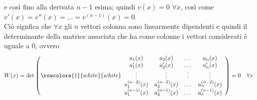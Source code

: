 \documentclass[a4paper]{extarticle}
\begin{document}
e così fino alla derivata $n-1$ esima; quindi $v(x)=0$ $\forall x$, così come $v'(x)=v''(x)=\dots=v^{(n-1)}(x)=0$.\\
Ciò signfica che $\forall x$ gli $n$ vettori colonna sono linearmente dipendenti e quindi il determinante della matrice associata che ha come colonne i vettori considerati è uguale a $0$, ovvero
\[{W(x)} = \det \left(
    \rowcolors{1}{white}{white}
    \begin{array}{cccc}
        u_1(x) & u_2(x) & \dots & u_n(x)\\
        u_1'(x) & u_2'(x) & \dots & u_n'(x)\\
        \vdots & \vdots & \vdots & \vdots\\
        u_1^{(n-2)}(x) & u_2^{(n-2)}(x) & \dots & u_n^{(n-2)}(x)\\
        u_1^{(n-1)}(x) & u_2^{(n-1)}(x) & \dots & u_n^{(n-1)}(x)\\
    \end{array}
\right) = 0 \hspace{1em} \forall x\]
\end{document}
